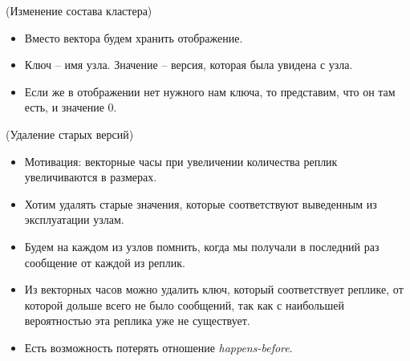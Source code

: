 \begin{algorithm}(Изменение состава кластера)
    \begin{itemize}
        \item Вместо вектора будем хранить отображение.
        \item Ключ -- имя узла. Значение -- версия, которая была увидена с узла.
        \item Если же в отображении нет нужного нам ключа, то представим, что он там есть, и значение $0$.
    \end{itemize}
\end{algorithm}

\begin{algorithm}(Удаление старых версий)
    \begin{itemize}
        \item Мотивация: векторные часы при увеличении количества реплик увеличиваются в размерах.
        \item Хотим удалять старые значения, которые соответствуют выведенным из эксплуатации узлам.
        \item Будем на каждом из узлов помнить, когда мы получали в последний раз сообщение от каждой из реплик.
        \item Из векторных часов можно удалить ключ, который соответствует реплике,
            от которой дольше всего не было сообщений, так как с наибольшей вероятностью эта реплика уже не существует.
        \item Есть возможность потерять отношение \textit{happens-before}.
    \end{itemize}
\end{algorithm}
